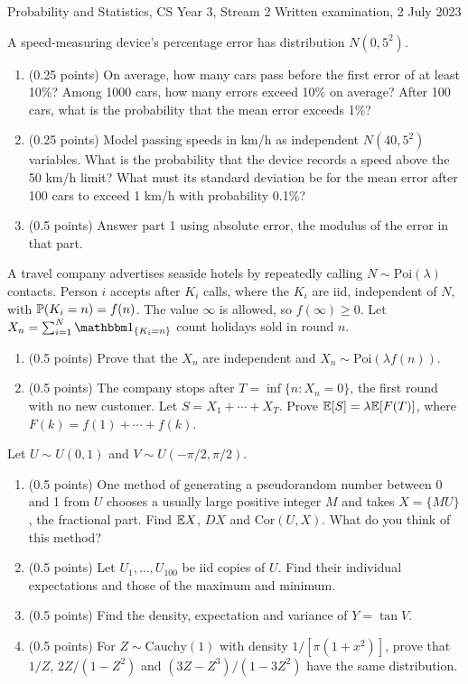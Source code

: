 \documentclass[a4paper]{report}
\begin{document}
\noindent Probability and Statistics, CS Year 3, Stream 2 \hfill Written examination, 2 July 2023
\hrulefill
\begin{problem}
A speed-measuring device's percentage error has distribution $N(0,5^2)$.
\begin{enumerate}
\item (0.25 points) On average, how many cars pass before the first error of at least 10\%? Among 1000 cars, how many errors exceed 10\% on average? After 100 cars, what is the probability that the mean error exceeds 1\%?
\item (0.25 points) Model passing speeds in km/h as independent $N(40,5^2)$ variables. What is the probability that the device records a speed above the 50 km/h limit? What must its standard deviation be for the mean error after 100 cars to exceed 1 km/h with probability 0.1\%?
\item (0.5 points) Answer part 1 using absolute error, the modulus of the error in that part.
\end{enumerate}
\end{problem}
\begin{problem}
A travel company advertises seaside hotels by repeatedly calling $N\sim\mathrm{Poi}(\lambda)$ contacts. Person $i$ accepts after $K_i$ calls, where the $K_i$ are iid, independent of $N$, with $\P(K_i=n)=f(n)$. The value $\infty$ is allowed, so $f(\infty)\geq0$. Let $X_n=\sum_{i=1}^N\mathbbm1_{\{K_i=n\}}$ count holidays sold in round $n$.
\begin{enumerate}
\item (0.5 points) Prove that the $X_n$ are independent and $X_n\sim\mathrm{Poi}(\lambda f(n))$.
\item (0.5 points) The company stops after $T=\inf\{n:X_n=0\}$, the first round with no new customer. Let $S=X_1+\cdots+X_T$. Prove $\E[S]=\lambda\E[F(T)]$, where $F(k)=f(1)+\cdots+f(k)$.
\end{enumerate}
\end{problem}
\begin{problem}
Let $U\sim U(0,1)$ and $V\sim U(-\pi/2,\pi/2)$.
\begin{enumerate}
\item (0.5 points) One method of generating a pseudorandom number between 0 and 1 from $U$ chooses a usually large positive integer $M$ and takes $X=\{MU\}$, the fractional part. Find $\E X$, $DX$ and $\mathrm{Cor}(U,X)$. What do you think of this method?
\item (0.5 points) Let $U_1,\ldots,U_{100}$ be iid copies of $U$. Find their individual expectations and those of the maximum and minimum.
\item (0.5 points) Find the density, expectation and variance of $Y=\tan V$.
\item (0.5 points) For $Z\sim\mathrm{Cauchy}(1)$ with density $1/[\pi(1+x^2)]$, prove that $1/Z$, $2Z/(1-Z^2)$ and $(3Z-Z^3)/(1-3Z^2)$ have the same distribution.
\end{enumerate}
\end{problem}
\end{document}
